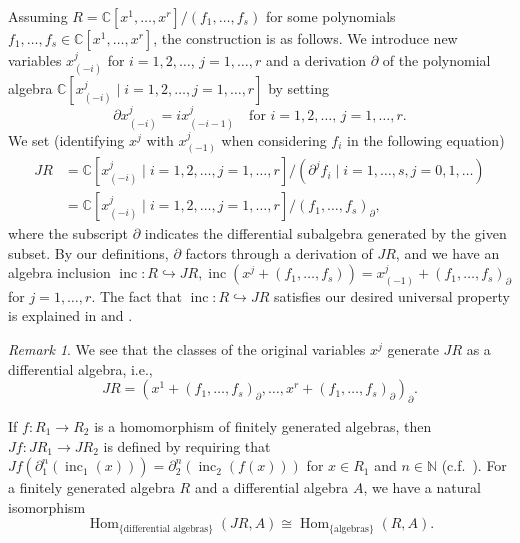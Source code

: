 \documentclass[a4paper, 12pt, reqno]{amsart}
\theoremstyle{remark}
\newtheorem{remark}[theorem]{Remark}
\DeclareMathOperator{\Hom}{Hom}
\DeclareMathOperator{\inc}{inc}
\begin{document}
Assuming $R = \mathbb{C}[x^1, \dots, x^r]/(f_1, \dots, f_s)$ for some polynomials $f_1, \dots, f_s \in \mathbb{C}[x^1, \dots, x^r]$, the construction is as follows.
We introduce new variables $x^j_{(-i)}$ for $i = 1, 2, \dots$, $j = 1, \dots, r$ and a derivation $\partial$ of the polynomial algebra $\mathbb{C}[x^j_{(-i)} \mid i = 1, 2, \dots, j = 1, \dots, r]$ by setting
\begin{equation*}
  \partial x^j_{(-i)} = ix^j_{(-i - 1)} \quad \text{for $i = 1, 2, \dots$, $j = 1, \dots, r$}.
\end{equation*}
We set (identifying $x^j$ with $x^j_{(-1)}$ when considering $f_i$ in the following equation)
\begin{align*}
  JR &= \mathbb{C}[x^j_{(-i)} \mid i = 1, 2, \dots, j = 1, \dots, r]/(\partial^jf_i \mid i = 1, \dots, s, j = 0, 1, \dots) \\
     &= \mathbb{C}[x^j_{(-i)} \mid i = 1, 2, \dots, j = 1, \dots, r]/(f_1, \dots, f_s)_{\partial},
\end{align*}
where the subscript $\partial$ indicates the differential subalgebra generated by the given subset.
By our definitions, $\partial$ factors through a derivation of $JR$, and we have an algebra inclusion $\inc: R \hookrightarrow JR, \inc(x^j + (f_1, \dots, f_s)) = x^j_{(-1)} + (f_1, \dots, f_s)_{\partial}$ for $j = 1, \dots, r$.
The fact that $\inc: R \hookrightarrow JR$ satisfies our desired universal property is explained in \cite[\S2.3]{arakawa_remark_2012} and \cite{ein_jet_2008}.

\begin{remark}
  \label{rmk:7}
  We see that the classes of the original variables $x^j$ generate $JR$ as a differential algebra, i.e.,
  \begin{equation*}
    JR = (x^1 + (f_1, \dots, f_s)_{\partial}, \dots, x^r + (f_1, \dots, f_s)_{\partial})_{\partial}.
  \end{equation*}
\end{remark}

If $f: R_1 \to R_2$ is a homomorphism of finitely generated algebras, then $Jf: JR_1 \to JR_2$ is defined by requiring that $Jf(\partial_1^n(\inc_1(x))) = \partial^n_2(\inc_2(f(x)))$ for $x \in R_1$ and $n \in \mathbb{N}$ (c.f.\ ).
For a finitely generated algebra $R$ and a differential algebra $A$, we have a natural isomorphism
\begin{equation*}
  \Hom_{\{\text{differential algebras}\}}(JR, A) \cong \Hom_{\{\text{algebras}\}}(R, A).
\end{equation*}
\end{document}
